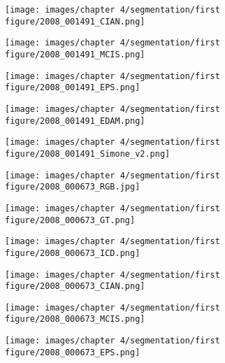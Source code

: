 \documentclass[runningheads]{styles/llncs}
\begin{document}
\begin{figure}[t]
\begin{subfigure}[b]{.11\linewidth}
\texttt{[image: images/chapter 4/segmentation/first figure/2008\_001491\_CIAN.png]}
\end{subfigure}
\begin{subfigure}[b]{.11\linewidth}
\texttt{[image: images/chapter 4/segmentation/first figure/2008\_001491\_MCIS.png]}
\end{subfigure}
\begin{subfigure}[b]{.11\linewidth}
\texttt{[image: images/chapter 4/segmentation/first figure/2008\_001491\_EPS.png]}
\end{subfigure}
\begin{subfigure}[b]{.11\linewidth}
\texttt{[image: images/chapter 4/segmentation/first figure/2008\_001491\_EDAM.png]}
\end{subfigure}
\begin{subfigure}[b]{.11\linewidth}
\texttt{[image: images/chapter 4/segmentation/first figure/2008\_001491\_Simone\_v2.png]}
\end{subfigure}
\begin{subfigure}[b]{.11\linewidth}
\texttt{[image: images/chapter 4/segmentation/first figure/2008\_000673\_RGB.jpg]}
\end{subfigure}
\begin{subfigure}[b]{.11\linewidth}
\texttt{[image: images/chapter 4/segmentation/first figure/2008\_000673\_GT.png]}
\end{subfigure}
\begin{subfigure}[b]{.11\linewidth}
\texttt{[image: images/chapter 4/segmentation/first figure/2008\_000673\_ICD.png]}
\end{subfigure}
\begin{subfigure}[b]{.11\linewidth}
\texttt{[image: images/chapter 4/segmentation/first figure/2008\_000673\_CIAN.png]}
\end{subfigure}
\begin{subfigure}[b]{.11\linewidth}
\texttt{[image: images/chapter 4/segmentation/first figure/2008\_000673\_MCIS.png]}
\end{subfigure}
\begin{subfigure}[b]{.11\linewidth}
\texttt{[image: images/chapter 4/segmentation/first figure/2008\_000673\_EPS.png]}
\end{subfigure}
\begin{subfigure}[b]{.11\linewidth}

\end{subfigure}
\end{figure}
\end{document}

